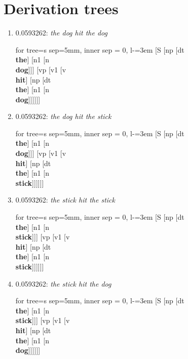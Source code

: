 \documentclass[11pt]{article}
\begin{document}
\section{Derivation trees}
\begin{enumerate}
	\item  0.0593262: \textit{the dog hit the dog} \\[0.5em]
	\begin{forest}
	for tree={s sep=5mm, inner sep = 0, l-=3em}
	[S [np [dt\\\textbf{the}] [n1 [n\\\textbf{dog}]]] [vp [v1 [v\\\textbf{hit}] [np [dt\\\textbf{the}] [n1 [n\\\textbf{dog}]]]]]]
	\end{forest}
	\newpage

	\item  0.0593262: \textit{the dog hit the stick} \\[0.5em]
	\begin{forest}
	for tree={s sep=5mm, inner sep = 0, l-=3em}
	[S [np [dt\\\textbf{the}] [n1 [n\\\textbf{dog}]]] [vp [v1 [v\\\textbf{hit}] [np [dt\\\textbf{the}] [n1 [n\\\textbf{stick}]]]]]]
	\end{forest}
	\newpage

	\item  0.0593262: \textit{the stick hit the stick} \\[0.5em]
	\begin{forest}
	for tree={s sep=5mm, inner sep = 0, l-=3em}
	[S [np [dt\\\textbf{the}] [n1 [n\\\textbf{stick}]]] [vp [v1 [v\\\textbf{hit}] [np [dt\\\textbf{the}] [n1 [n\\\textbf{stick}]]]]]]
	\end{forest}
	\newpage

	\item  0.0593262: \textit{the stick hit the dog} \\[0.5em]
	\begin{forest}
	for tree={s sep=5mm, inner sep = 0, l-=3em}
	[S [np [dt\\\textbf{the}] [n1 [n\\\textbf{stick}]]] [vp [v1 [v\\\textbf{hit}] [np [dt\\\textbf{the}] [n1 [n\\\textbf{dog}]]]]]]
	\end{forest}
	\newpage


\end{enumerate}
\end{document}
